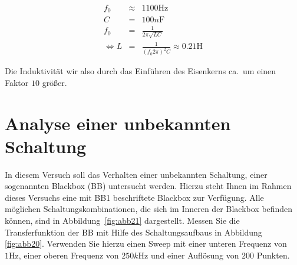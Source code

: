 \documentclass[10pt]{scrreprt}
\begin{document}
        \begin{eqnarray}
            f_0 &\approx& 1100\si{\hertz}\\
            C &=& 100\si{n\farad}\\
            f_0 &=& \frac{1}{2 \pi \sqrt{L C}}\\
            \Leftrightarrow L &=& \frac{1}{{(f_0 2 \pi)}^2 C} \approx 0.21\si{\henry}
        \end{eqnarray}

        Die Induktivität wir also durch das Einführen des Eisenkerns ca.\ um einen Faktor
        $10$ größer.


        \section{Analyse einer unbekannten Schaltung}
        In diesem Versuch soll das Verhalten einer unbekannten Schaltung, einer sogenannten
        Blackbox (BB) untersucht werden. Hierzu steht Ihnen im Rahmen dieses Versuchs eine
        mit BB1 beschriftete Blackbox zur Verfügung. Alle möglichen Schaltungskombinationen,
        die sich im Inneren der Blackbox befinden können, sind in Abbildung~\ref{fig:abb21} dargestellt.
        Messen Sie die Transferfunktion der BB mit Hilfe des Schaltungsaufbaus in Abbildung
        \ref{fig:abb20}. Verwenden Sie hierzu einen Sweep mit einer unteren Frequenz von $1\si{\hertz}$, einer oberen
        Frequenz von $250\si{k\hertz}$ und einer Auflösung von $200$ Punkten.
\end{document}
